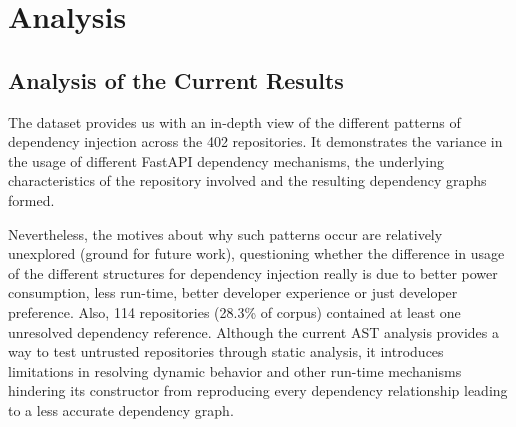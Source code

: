 \section{Analysis}

\subsection{Analysis of the Current Results}

The dataset provides us with an in-depth view of the different patterns of dependency injection across the 402 repositories. It demonstrates the variance in the usage of different FastAPI dependency mechanisms, the underlying characteristics of the repository involved and the resulting dependency graphs formed.

Nevertheless, the motives about why such patterns occur are relatively unexplored (ground for future work), questioning whether the difference in usage of the different structures for dependency injection really is due to better power consumption, less run-time, better developer experience or just developer preference. Also, 114 repositories (28.3\% of corpus) contained at least one unresolved dependency reference. Although the current AST analysis provides a way to test untrusted repositories through static analysis, it introduces limitations in resolving dynamic behavior and other run-time mechanisms hindering its constructor from reproducing every dependency relationship leading to a less accurate dependency graph.